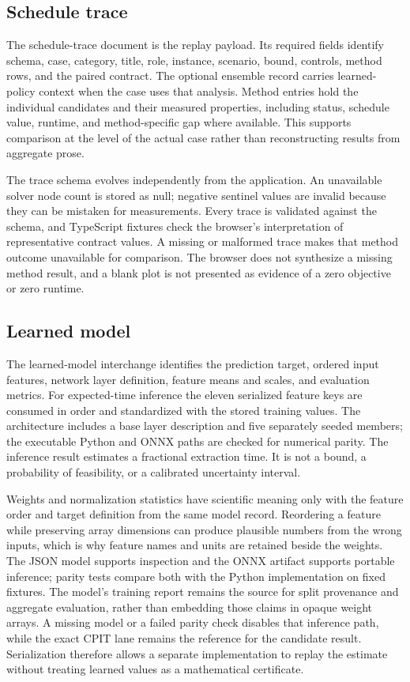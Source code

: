 \subsection{Schedule trace}
\label{sec:data-trace}
The schedule-trace document is the replay payload. Its required fields identify schema, case, category, title, role, instance, scenario, bound, controls, method rows, and the paired contract. The optional ensemble record carries learned-policy context when the case uses that analysis. Method entries hold the individual candidates and their measured properties, including status, schedule value, runtime, and method-specific gap where available. This supports comparison at the level of the actual case rather than reconstructing results from aggregate prose.

The trace schema evolves independently from the application. An unavailable solver node count is stored as null; negative sentinel values are invalid because they can be mistaken for measurements. Every trace is validated against the schema, and TypeScript fixtures check the browser's interpretation of representative contract values. A missing or malformed trace makes that method outcome unavailable for comparison. The browser does not synthesize a missing method result, and a blank plot is not presented as evidence of a zero objective or zero runtime.

\subsection{Learned model}
\label{sec:data-model}
The learned-model interchange identifies the prediction target, ordered input features, network layer definition, feature means and scales, and evaluation metrics. For expected-time inference the eleven serialized feature keys are consumed in order and standardized with the stored training values. The architecture includes a base layer description and five separately seeded members; the executable Python and ONNX paths are checked for numerical parity. The inference result estimates a fractional extraction time. It is not a bound, a probability of feasibility, or a calibrated uncertainty interval.

Weights and normalization statistics have scientific meaning only with the feature order and target definition from the same model record. Reordering a feature while preserving array dimensions can produce plausible numbers from the wrong inputs, which is why feature names and units are retained beside the weights. The JSON model supports inspection and the ONNX artifact supports portable inference; parity tests compare both with the Python implementation on fixed fixtures. The model's training report remains the source for split provenance and aggregate evaluation, rather than embedding those claims in opaque weight arrays. A missing model or a failed parity check disables that inference path, while the exact CPIT lane remains the reference for the candidate result. Serialization therefore allows a separate implementation to replay the estimate without treating learned values as a mathematical certificate.

